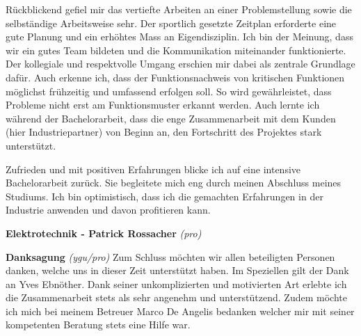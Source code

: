 Rückblickend gefiel mir das vertiefte Arbeiten an einer Problemstellung sowie die selbständige Arbeitsweise sehr. Der sportlich gesetzte Zeitplan erforderte eine gute Planung und ein erhöhtes Mass an Eigendisziplin. Ich bin der Meinung, dass wir ein gutes Team bildeten und die Kommunikation miteinander funktionierte. Der kollegiale und respektvolle Umgang erschien mir dabei als zentrale Grundlage dafür. Auch erkenne ich, dass der Funktionsnachweis von kritischen Funktionen möglichst frühzeitig und umfassend erfolgen soll. So wird gewährleistet, dass Probleme nicht erst am Funktionsmuster erkannt werden. Auch lernte ich während der Bachelorarbeit, dass die enge Zusammenarbeit mit dem Kunden (hier Industriepartner) von Beginn an, den Fortschritt des Projektes stark unterstützt.
\newline

Zufrieden und mit positiven Erfahrungen blicke ich auf eine intensive Bachelorarbeit zurück. Sie begleitete mich eng durch meinen Abschluss meines Studiums. Ich bin optimistisch, dass ich die gemachten Erfahrungen in der Industrie anwenden und davon profitieren kann.
\newline

\textbf{Elektrotechnik - Patrick Rossacher}
\newline
\textit{(pro)}
\newline	

\textbf{Danksagung}
\newline
\textit{(ygu/pro)} Zum Schluss möchten wir allen beteiligten Personen danken, welche uns in dieser Zeit unterstützt haben. 
Im Speziellen gilt der Dank an Yves Ebnöther. Dank seiner unkomplizierten und motivierten Art 
erlebte ich die Zusammenarbeit stets als sehr angenehm und unterstützend. Zudem möchte ich mich 
bei meinem Betreuer Marco De Angelis bedanken welcher mir mit seiner kompetenten Beratung stets 
eine Hilfe war. 

